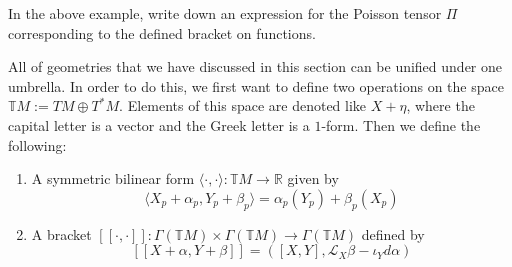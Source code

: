 \begin{exercise}
In the above example, write down an expression for the Poisson tensor $\Pi$ corresponding to the defined bracket on functions.
\end{exercise}
All of geometries that we have discussed in this section can be unified under one umbrella. In order to do this, we first want to define two operations on the space $\mathbb{T}M:=TM\oplus T^*M$. Elements of this space are denoted like $X+\eta$, where the capital letter is a vector and the Greek letter is a $1$-form. Then we define the following:
\begin{enumerate}
  \item A symmetric bilinear form $\langle\cdot,\cdot\rangle:\mathbb{T}M\to\mathbb{R}$ given by $$\langle X_p + \alpha_p,Y_p + \beta_p\rangle=\alpha_p(Y_p)+\beta_p(X_p)$$
  \item A bracket  $[\![\cdot,\cdot]\!]:\Gamma(\mathbb{T}M)\times\Gamma(\mathbb{T}M)\to\Gamma(\mathbb{T}M)$ defined by $$[\![X+\alpha,Y+\beta]\!]=([X,Y],\mathcal{L}_X\beta-\iota_Yd\alpha)$$
\end{enumerate}

